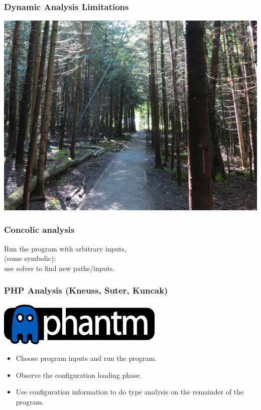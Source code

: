 \documentclass{beamer}
\newenvironment{changemargin}[1]{%
  \begin{list}{}{%
    \setlength{\topsep}{0pt}%
    \setlength{\leftmargin}{#1}%
    \setlength{\rightmargin}{1em}
    \setlength{\listparindent}{\parindent}%
    \setlength{\itemindent}{\parindent}%
    \setlength{\parsep}{\parskip}%
  }%
  \item[]}{\end{list}}
\begin{document}
\begin{frame}
  \frametitle{Dynamic Analysis Limitations}

\centering
\includegraphics[width=.6\textwidth]{images/0013_class_1_trail.JPG}

\end{frame}


\begin{frame}
  \frametitle{Concolic analysis}

\Large
\begin{changemargin}{1cm}
Run the program with arbitrary inputs, \\
\hspace*{2em} (some symbolic);\\
use solver to find new paths/inputs.
\end{changemargin}
\end{frame}

\begin{frame}
  \frametitle{PHP Analysis (Kneuss, Suter, Kuncak)}

\Large
\begin{center}
\includegraphics[width=.2\textwidth]{images/phantm-blue-solid.png}
\end{center}
\begin{itemize}
\item Choose program inputs and run the program.
\item Observe the configuration loading phase.
\item Use configuration information to do type analysis on the remainder of the program.
\end{itemize}
\end{frame}
\end{document}

